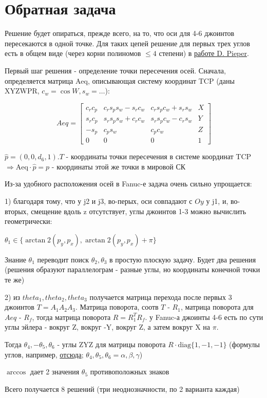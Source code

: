 \documentclass{article}
\begin{document}
\section{Обратная задача}

Решение будет опираться, прежде всего, на то, что оси для 4-6 джоинтов пересекаются в одной точке. Для таких цепей решение для первых трех углов есть в общем виде (через корни полиномов $\leq4$ степени) в \href{https://web.archive.org/web/20160924184009/http://www.dtic.mil/get-tr-doc/pdf?AD=AD0680036}{работе D. Pieper}.

Первый шаг решения - определение точки пересечения осей. Сначала, определяется матрица $\text{Aeq}$, описывающая систему координат TCP (даны XYZWPR, $c_w=\cos W, s_w=\dots$):

$$Aeq = \begin{bmatrix}
c_r c_p & c_r s_p s_w - s_r c_w & c_r s_p c_w + s_r s_w & X\\
s_r c_p & s_r s_p s_w + c_r c_w & s_r s_p c_w - c_r s_w & Y\\
-s_p & c_p s_w & c_p c_w & Z\\
0 & 0 & 0 & 1
\end{bmatrix}$$

$\hat{p} = (0, 0, d_6, 1).T$ - координаты точки пересечения в системе координат TCP $\Rightarrow \text{Aeq}\cdot\hat{p}=p$ - координаты этой же точки в мировой СК

Из-за удобного расположения осей в Fanuc-е задача очень сильно упрощается:

1) благодаря тому, что у j2 и j3, во-перых, оси совпадают с $O\!y$ у j1, и, во-вторых, смещение вдоль z отсутствует, углы джоинтов 1-3 можно вычислить геометрически:

$\theta_1 \in \{\arctan\!2(p_y, p_x), \arctan\!2(p_y, p_x)+\pi\}$

Знание $\theta_1$ переводит поиск $\theta_2, \theta_3$ в простую плоскую задачу. Будет два решения (решения образуют параллелограм - разные углы, но координаты конечной точки те же) $ $\newline

2) из $theta_1, theta_2, theta_3$ получается матрица перехода после первых 3 джоинтов $T = A_1A_2A_3$. Матрица поворота, соотв $T$ - $R_1$, матрица поворота для $Aeq$ - $R_f$, тогда матрица поворота $R = R_1^TR_f$. у Fanuc-а джоинты 4-6 есть по сути углы эйлера - вокруг Z, вокруг -Y, вокруг Z, а затем вокруг X на $\pi$.

Тогда $\theta_4, -\theta_5, \theta_6$ - углы ZYZ для матрицы поворота $R\cdot\text{diag}\{1,-1,-1\}$ (формулы углов, например, \href{https://en.wikipedia.org/wiki/Euler_angles#Rotation_matrix}{отсюда}; $\theta_4, \theta_5, \theta_6 = \alpha, \beta, \gamma$)

$\arccos$ дает 2 значения $\theta_5$ противоположных знаков

Всего получается 8 решений (три неоднозначности, по 2 варианта каждая)
\end{document}

